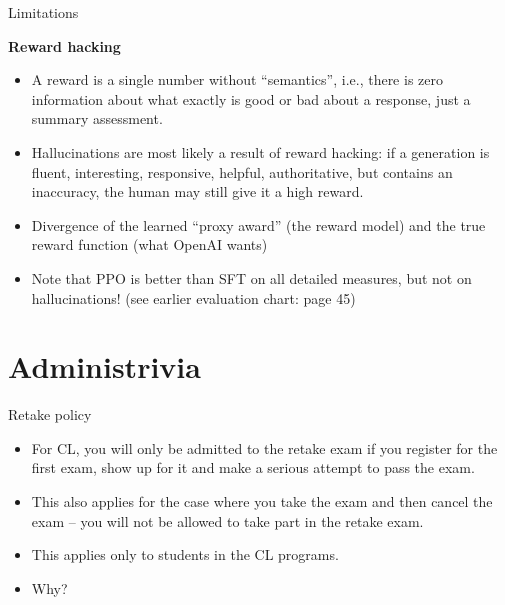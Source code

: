 \begin{vbframe}{Limitations}

\vfill

\textbf{Reward hacking}

	\begin{itemize}
		\item
                A reward is a single number without
		``semantics'', i.e., there is zero
		information about what exactly is good or
		bad about a response, just a summary
		assessment.
                
\item Hallucinations are most likely a result of reward
		hacking: if a generation is fluent,
	interesting, responsive, helpful, authoritative, but
	contains an inaccuracy, the human may still give it a
	high reward.
        \item Divergence of the learned ``proxy award'' (the
	reward model) and the true reward function (what
	OpenAI wants)
        \item Note that PPO is better than SFT on all
	detailed measures, but not on hallucinations! (see
	earlier evaluation chart: page 45)
	\end{itemize}

\vfill

\end{vbframe}


\section{Administrivia}


\begin{vbframe}{Retake policy}

\vfill

	\begin{itemize}
\item
For CL, you will
only be admitted to the retake exam if you register for the
first exam, show up for it and make a serious attempt
to pass the exam.
\item This also applies for the case where you take the exam
and then cancel the exam -- you will not be allowed to take
part in the retake exam.
\item This applies only to  students in the CL programs.
\item Why?
\end{itemize}

\vfill

\end{vbframe}

